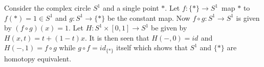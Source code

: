 \documentclass[../../main.tex]{subfiles}
\begin{document}
    \begin{example}
        Consider the complex circle $S^1$ and a single point $*$. Let $f: \{*\} \to S^1$ map $*$ to $f(*) = 1 \in S^1$ and $g: S^1 \to \{*\}$ be the constant map. Now $f \circ g: S^1 \to S^1$ is given by $(f \circ g)(x) = 1$. Let $H: S^1 \times [0, 1] \to S^1$ be given by $H(x, t) = t + (1-t)x$. It is then seen that $H(-, 0) = id_{}$ and $H(-, 1) = f \circ g$ while $g \circ f = id_{\{*\}}$ itself which shows that $S^1$ and $\{*\}$ are homotopy equivalent.
    \end{example}
\end{document}
